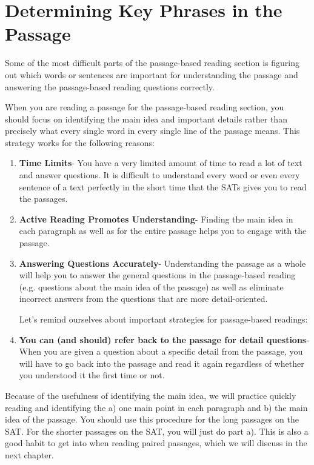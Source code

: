 \section{Determining Key Phrases in the Passage}

Some of the most difficult parts of the passage-based reading section is figuring out which words or
sentences are important for understanding the passage and answering the passage-based reading
questions correctly.

When you are reading a passage for the passage-based reading section, you should focus on identifying the main idea and important details rather than precisely what every single word in every
single line of the passage means. This strategy works for the following reasons:

\begin{enumerate}

\item \textbf{Time Limits}- You have a very limited amount of time to read a lot of text and answer questions. It is difficult to understand every word or even every sentence of a text perfectly in the short time that the SATs gives you to read the passages. 

\item \textbf{Active Reading Promotes Understanding}- Finding the main idea in each paragraph as well as for the entire passage helps you to engage with the passage. 

\item \textbf{Answering Questions Accurately}- Understanding the passage as a whole
will help you to answer the general questions in the passage-based reading (e.g. questions about the main idea of the passage) as well as eliminate
incorrect answers from the questions that are more detail-oriented.

Let's remind ourselves about important strategies for passage-based readings:

\item \textbf{You can (and should) refer back to the passage for detail questions}- When you are given a
question about a specific detail from the passage, you will have to go back into the passage and
read it again regardless of whether you understood it the first time or not.

\end{enumerate}

Because of the usefulness of identifying the main idea, we will practice quickly reading and identifying the a) one main point in each paragraph and b) the main idea of the passage. You should use this procedure for the long passages on the SAT. For the shorter passages on the SAT, you will just do part a). This is also a good habit to get into when reading paired passages, which we will discuss in the next chapter. 

